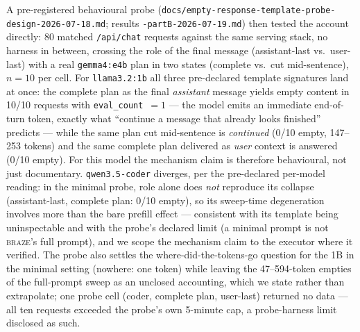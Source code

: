 \documentclass[smallcondensed,natbib]{svjour3}
\newcommand{\braze}{\textsc{braze}}
\begin{document}
A pre-registered behavioural probe
(\texttt{docs/empty-response-template-probe-design-2026-07-18.md};
results \texttt{-partB-2026-07-19.md}) then tested the account
directly: 80 matched \texttt{/api/chat} requests against the same
serving stack, no harness in between, crossing the role of the final
message (assistant-last vs.\ user-last) with a real
\texttt{gemma4:e4b} plan in two states (complete vs.\ cut
mid-sentence), $n{=}10$ per cell. For \texttt{llama3.2:1b} all three
pre-declared template signatures land at once: the complete plan as
the final \emph{assistant} message yields empty content in 10/10
requests with \texttt{eval\_count}~$=1$ --- the model emits an
immediate end-of-turn token, exactly what ``continue a message that
already looks finished'' predicts --- while the same plan cut
mid-sentence is \emph{continued} (0/10 empty, 147--253 tokens) and the
same complete plan delivered as \emph{user} context is answered (0/10
empty). For this model the mechanism claim is therefore behavioural,
not just documentary. \texttt{qwen3.5-coder} diverges, per the
pre-declared per-model reading: in the minimal probe, role alone does
\emph{not} reproduce its collapse (assistant-last, complete plan: 0/10
empty), so its sweep-time degeneration involves more than the bare
prefill effect --- consistent with its template being uninspectable
and with the probe's declared limit (a minimal prompt is not
\braze{}'s full prompt), and we scope the mechanism claim to the
executor where it verified. The probe also settles the
where-did-the-tokens-go question for the 1B in the minimal setting
(nowhere: one token) while leaving the 47--594-token empties of the
full-prompt sweep as an unclosed accounting, which we state rather
than extrapolate; one probe cell (coder, complete plan, user-last)
returned no data --- all ten requests exceeded the probe's own
5-minute cap, a probe-harness limit disclosed as such.
\end{document}
